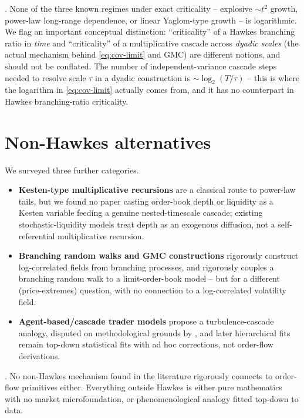 \documentclass[11pt]{article}
\begin{document}
\begin{finding}
. None of the three known regimes under exact criticality -- explosive $\sim t^2$ growth, power-law long-range dependence, or linear Yaglom-type growth -- is logarithmic. We flag an important conceptual distinction: ``criticality'' of a Hawkes branching ratio in \emph{time} and ``criticality'' of a multiplicative cascade across \emph{dyadic scales} (the actual mechanism behind \eqref{eq:cov-limit} and GMC) are different notions, and should not be conflated. The number of independent-variance cascade steps needed to resolve scale $\tau$ in a dyadic construction is $\sim\log_2(T/\tau)$ -- this is where the logarithm in \eqref{eq:cov-limit} actually comes from, and it has no counterpart in Hawkes branching-ratio criticality.
\end{finding}

\section{Non-Hawkes alternatives}

We surveyed three further categories.

\begin{itemize}
\item \textbf{Kesten-type multiplicative recursions} \citep{sornette1997convergent} are a classical route to power-law tails, but we found no paper casting order-book depth or liquidity as a Kesten variable feeding a genuine nested-timescale cascade; existing stochastic-liquidity models treat depth as an exogenous diffusion, not a self-referential multiplicative recursion.
\item \textbf{Branching random walks and GMC constructions} \citep{rhodes2014gaussian} rigorously construct log-correlated fields from branching processes, and \citet{simatos2014coupling} rigorously couples a branching random walk to a limit-order-book model -- but for a different (price-extremes) question, with no connection to a log-correlated volatility field.
\item \textbf{Agent-based/cascade trader models} \citep{ghashghaie1996turbulent} propose a turbulence-cascade analogy, disputed on methodological grounds by \citet{barndorffnielsen1997comment}, and later hierarchical fits \citep{cascade2018multiplicative} remain top-down statistical fits with ad hoc corrections, not order-flow derivations.
\end{itemize}

\begin{finding}
. No non-Hawkes mechanism found in the literature rigorously connects to order-flow primitives either. Everything outside Hawkes is either pure mathematics with no market microfoundation, or phenomenological analogy fitted top-down to data.
\end{finding}
\end{document}
